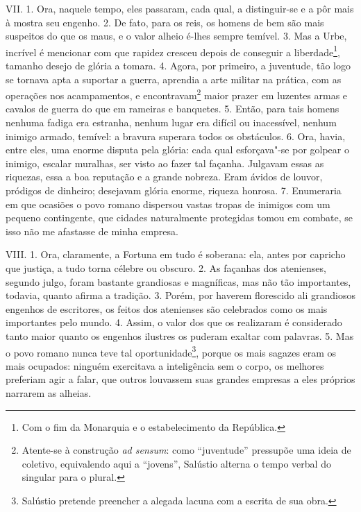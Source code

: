 VII. 1. Ora, naquele tempo, eles passaram, cada qual, a distinguir-se e a pôr
mais à mostra seu engenho. 2. De fato, para os reis, os homens de bem são mais
suspeitos do que os maus, e o valor alheio é-lhes sempre temível. 3. Mas a
Urbe, incrível é mencionar com que rapidez cresceu depois de conseguir a
liberdade\footnote{Com o fim da Monarquia e o estabelecimento da República.},
tamanho desejo de glória a tomara. 4. Agora, por primeiro, a juventude, tão
logo se tornava apta a suportar a guerra, aprendia a arte militar na prática,
com as operações nos acampamentos, e encontravam\footnote{Atente-se à
construção \emph{ad sensum}: como ``juventude'' pressupõe uma ideia de
coletivo, equivalendo aqui a ``jovens'', Salústio alterna o tempo verbal do
singular para o plural.} maior prazer em luzentes armas e cavalos de guerra do
que em rameiras e banquetes. 5. Então, para tais homens nenhuma fadiga era
estranha, nenhum lugar era difícil ou inacessível, nenhum inimigo armado,
temível: a bravura superara todos os obstáculos. 6. Ora, havia, entre eles, uma
enorme disputa pela glória: cada qual esforçava"-se por golpear o inimigo,
escalar muralhas, ser visto ao fazer tal façanha. Julgavam essas as riquezas,
essa a boa reputação e a grande nobreza. Eram ávidos de louvor, pródigos de
dinheiro; desejavam glória enorme, riqueza honrosa. 7. Enumeraria em que
ocasiões o povo romano dispersou vastas tropas de inimigos com um pequeno
contingente, que cidades naturalmente protegidas tomou em combate, se isso não
me afastasse de minha empresa.

VIII. 1. Ora, claramente, a Fortuna em tudo é soberana: ela, antes por capricho
que justiça, a tudo torna célebre ou obscuro. 2. As façanhas dos atenienses,
segundo julgo, foram bastante grandiosas e magníficas, mas não tão importantes,
todavia, quanto afirma a tradição. 3. Porém, por haverem florescido ali
grandiosos engenhos de escritores, os feitos dos atenienses são celebrados como
os mais importantes pelo mundo. 4. Assim, o valor dos que os realizaram é
considerado tanto maior quanto os engenhos ilustres os puderam exaltar com
palavras. 5. Mas o povo romano nunca teve tal oportunidade\footnote{Salústio
pretende preencher a alegada lacuna com a escrita de sua obra.}, porque os mais
sagazes eram os mais ocupados: ninguém exercitava a inteligência sem o corpo,
os melhores preferiam agir a falar, que outros louvassem suas grandes empresas
a eles próprios narrarem as alheias.

